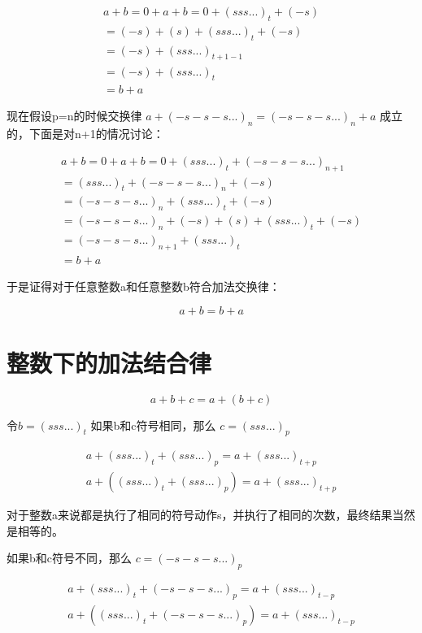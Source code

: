 \documentclass[12pt,oneside]{book}
\begin{document}
\begin{align*}
a + b = 0 + a +b = 0 + (sss...)_t + (-s)\\
=(-s) + (s) + (sss...)_{t} + (-s)\\
= (-s) + (sss...)_{t+1-1}\\
= (-s) + (sss...)_t\\
= b+a
\end{align*}

现在假设p=n的时候交换律 $a+(-s-s-s...)_n=(-s-s-s...)_n+a$ 成立的，下面是对n+1的情况讨论：

\begin{align*}
a + b = 0 + a +b = 0 + (sss...)_t + (-s-s-s...)_{n+1}\\
=(sss...)_{t} +(-s-s-s...)_{n} + (-s)\\
= (-s-s-s...)_{n} + (sss...)_{t} + (-s)\\
= (-s-s-s...)_{n} + (-s) + (s) + (sss...)_t + (-s)\\
= (-s-s-s...)_{n+1} + (sss...)_t\\
= b + a
\end{align*}

于是证得对于任意整数a和任意整数b符合加法交换律：

\begin{equation}
a+ b = b+ a
\end{equation}



\section{整数下的加法结合律}
\begin{equation}
a + b + c = a + (b + c)
\end{equation}

令$b=(sss...)_t$  如果b和c符号相同，那么 $c=(sss...)_p$

\begin{align}
a + (sss...)_t + (sss...)_p = a+ (sss...)_{t+p}\\
a + ((sss...)_t + (sss...)_p) = a+ (sss...)_{t+p}
\end{align}

对于整数a来说都是执行了相同的符号动作s，并执行了相同的次数，最终结果当然是相等的。

如果b和c符号不同，那么 $c=(-s-s-s...)_p$

\begin{align}
a + (sss...)_t + (-s-s-s...)_p = a+ (sss...)_{t-p}\\
a + ((sss...)_t + (-s-s-s...)_p) = a+ (sss...)_{t-p}
\end{align}
\end{document}
